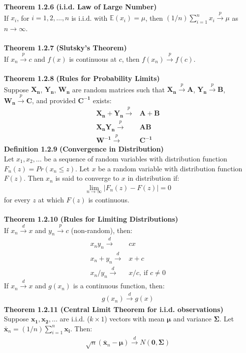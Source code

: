 \documentclass{article}
\begin{document}
\textbf{Theorem 1.2.6} \textbf{(i.i.d. Law of Large Number)}\\
If $x_i$, for $i = 1, 2, \ldots, n$ is i.i.d. with $\mathbb{E}(x_i) = \mu$, then $(1/n) \sum^n_{i=1} x_i \xrightarrow{p} \mu$ as $n \to \infty$.\\\\
\textbf{Theorem 1.2.7} \textbf{(Slutsky's Theorem)}\\
If $x_n \xrightarrow{p} c$ and $f(x)$ is continuous at $c$, then $f(x_n) \xrightarrow{p} f(c)$.\\\\
\textbf{Theorem 1.2.8} \textbf{(Rules for Probability Limits)}\\
Suppose $\boldsymbol{X_n}$, $\boldsymbol{Y_n}$, $\boldsymbol{W_n}$ are random matrices such that $\boldsymbol{X_n} \xrightarrow{p} \boldsymbol{A}$, $\boldsymbol{Y_n} \xrightarrow{p} \boldsymbol{B}$, $\boldsymbol{W_n} \xrightarrow{p} \boldsymbol{C}$, and provided $\boldsymbol{C^{-1}}$ exists:
	\begin{align*}
		\boldsymbol{X_n} + \boldsymbol{Y_n} \xrightarrow{p} &\boldsymbol{A} + \boldsymbol{B}\\
		\boldsymbol{X_n} \boldsymbol{Y_n} \xrightarrow{p} &\boldsymbol{AB}\\
		\boldsymbol{W^{-1}} \xrightarrow{p} &\boldsymbol{C^{-1}} 
	\end{align*}
\textbf{Definition 1.2.9} \textbf{(Convergence in Distribution)}\\
Let $x_1, x_2, \ldots$ be a sequence of random variables with distribution function $F_n(z) = Pr(x_n \leq z)$. Let $x$ be a random variable with distribution function $F(z)$. Then $x_n$ is said to converge to $x$ in distribution if:
	\begin{align*}
		\lim\limits_{n\to\infty} |F_n(z) - F(z)| = 0
	\end{align*}
for every $z$ at which $F(z)$ is continuous.\\\\
\textbf{Theorem 1.2.10 (Rules for Limiting Distributions)}\\
If $x_n \xrightarrow{d} x$ and $y_n \xrightarrow{p} c$ (non-random), then:
	\begin{align*}
		x_n y_n \xrightarrow{d} &cx\\
		x_n + y_n \xrightarrow{d} & x+ c\\
		x_n / y_n \xrightarrow{d} &x / c,\ \text{if $c \neq 0$}
	\end{align*}
If $x_n \xrightarrow{d} x$ and $g(x_n)$ is a continuous function, then:
	\begin{align*}
		g(x_n) \xrightarrow{d} g(x)
	\end{align*}
\textbf{Theorem 1.2.11 (Central Limit Theorem for i.i.d. observations)}\\
Suppose $\boldsymbol{x_1}, \boldsymbol{x_2}, \ldots$ are i.i.d. ($k \times 1$) vectors with mean $\boldsymbol{\mu}$ and variance $\boldsymbol{\Sigma}$. Let $\bar{\boldsymbol{x}}_n = (1/n)\sum^n_{i=1} \boldsymbol{x_i}$. Then:
	\begin{align*}
		\sqrt{n}(\bar{\boldsymbol{x}}_n - \boldsymbol{\mu}) \xrightarrow{d} N(\boldsymbol{0}, \boldsymbol{\Sigma})
	\end{align*}
\end{document}
